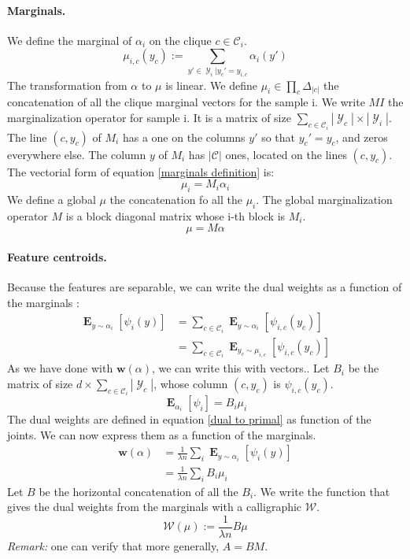 \documentclass{article}
\DeclareMathOperator{\1}{\mathbb{1}}
\DeclareMathOperator{\E}{\mathbf{E}}
\DeclareMathOperator{\Y}{\mathcal{Y}}
\begin{document}
\paragraph{Marginals.}
We define the marginal of $\alpha_i$ on the clique $c \in \mathcal C_i$.
\begin{equation}
	\label{marginals definition}
	\mu_{i, c}(y_c) := \sum_{y'\in \Y_i | y_c' = y_{i, c}} \alpha_i(y')
\end{equation}
The transformation from $\alpha$ to $\mu$ is linear.
We define $\mu_i \in \prod_c \Delta_|c|$ the concatenation of all the clique marginal vectors for the sample i.
We write $MI$ the marginalization operator for sample i.
It is a matrix of size $\sum_{c \in \mathcal C_i} |\Y_c| \times |\Y_i |$.
The line $(c, y_c)$ of $M_i$ has a one on the columns $y'$ so that $y_c'=y_c$, and zeros everywhere else.
The column $y$ of $M_i$ has $|\mathcal C|$ ones, located on the lines $(c, y_c)$.
The vectorial form of equation \ref{marginals definition} is:
\begin{equation*}
	\mu_i = M_i \alpha_i
\end{equation*}
We define a global $\mu$ the concatenation fo all the $\mu_i$.
The global marginalization operator $M$ is a block diagonal matrix whose i-th block is $M_i$.
\begin{equation}
	\label{marginals vectorial}
	\mu = M \alpha
\end{equation} 

\paragraph{Feature centroids.}
Because the features are separable, we can write the dual weights as a function of the marginals :
\begin{align*}
	\E_{y \sim \alpha_i}[\psi_i(y)]
   	&  = \sum_{c \in \mathcal C_i} \E_{y \sim \alpha_i}  [\psi_{i, c}(y_c)]  \\
   	&  = \sum_{c \in \mathcal C_i} \E_{y_c \sim \mu_{i, c}}  [\psi_{i, c}(y_c)] 
\end{align*}
As we have done with $\bm w(\alpha)$, we can write this with vectors..
Let  $B_i$ be the matrix of size $d \times  \sum_{c \in \mathcal C_i} |\Y_c|$, whose column $(c, y_c)$ is $\psi_{i, c}(y_c)$.
\begin{equation*}
	 \E_{\alpha_i}[\psi_i] = B_i \mu_i
\end{equation*}
The dual weights are defined in equation \ref{dual to primal} as function of the joints. We can now express them as a function of the marginals.
\begin{align*}
	\bm w (\alpha)
	& =\frac{1}{\lambda n} \sum_i \E_{y \sim \alpha_i}[\psi_i(y)] \\
	& = \frac{1}{\lambda n} \sum_i B_i \mu_i
\end{align*}
Let $B$ be the horizontal concatenation of all the $B_i$. We write the function that gives the dual weights from the marginals with a calligraphic $\mathcal W$.
\begin{equation}
	\label{marginals to primal}
	\mathcal W (\mu) := \frac{1}{\lambda n} B \mu
\end{equation}
\textit{Remark:} one can verify that more generally, $A=BM$.
\end{document}
